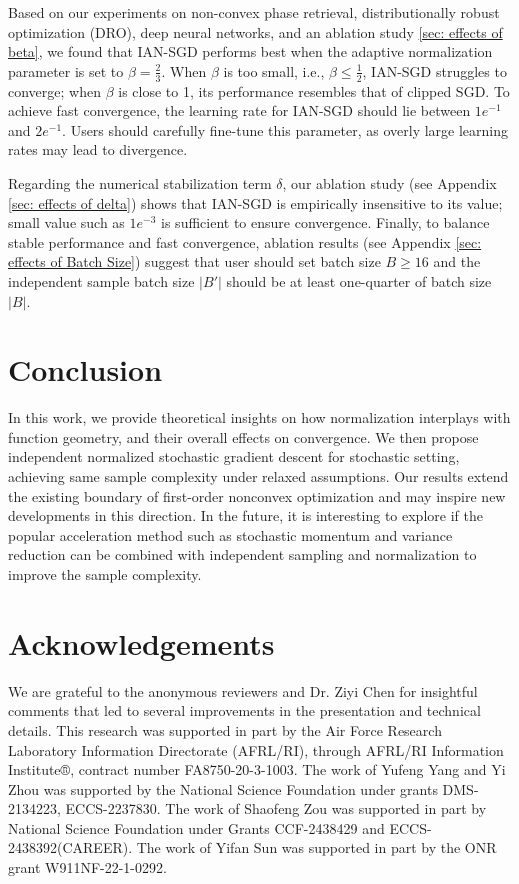 \documentclass[10pt]{article} %
\begin{document}
Based on our experiments on non-convex phase retrieval, distributionally robust optimization (DRO), deep neural networks, and an ablation study \ref{sec: effects of beta}, we found that IAN-SGD performs best when the adaptive normalization parameter is set to $\beta = \frac{2}{3}$. When $\beta$ is too small, i.e., $\beta\leq\frac{1}{2}$, IAN-SGD struggles to converge; when $\beta$ is close to 1, its performance resembles that of clipped SGD. To achieve fast convergence, the learning rate for IAN-SGD should lie between $1e^{-1}$ and $2e^{-1}$. Users should carefully fine-tune this parameter, as overly large learning rates may lead to divergence.

Regarding the numerical stabilization term $\delta$, our ablation study (see Appendix \ref{sec: effects of delta}) shows that IAN-SGD is empirically insensitive to its value; small value such as $1e^{-3}$ is sufficient to ensure convergence. Finally, to balance stable performance and fast convergence, ablation results (see Appendix \ref{sec: effects of Batch Size}) suggest that user should set batch size $B\geq 16$ and the independent sample batch size $|B'|$ should be at least one-quarter of batch size $|B|$.


\section{Conclusion}
In this work, we provide theoretical insights on how normalization interplays with function geometry, and their overall effects on convergence. We then propose independent normalized stochastic gradient descent for stochastic setting, achieving same sample complexity under relaxed assumptions. Our results extend the existing boundary of first-order nonconvex optimization and may inspire new
developments in this direction. In the future, it is interesting to explore if the popular acceleration method such as stochastic momentum and variance reduction can be combined with independent sampling and normalization to improve the sample complexity.

\section{Acknowledgements}
We are grateful to the anonymous reviewers and Dr. Ziyi Chen for insightful comments that led to several improvements in the presentation and technical details.
This research was supported in part by the Air Force Research Laboratory Information Directorate (AFRL/RI), through AFRL/RI Information Institute®, contract number FA8750-20-3-1003. The work of Yufeng Yang and Yi Zhou was supported by the National Science Foundation under grants DMS-2134223, ECCS-2237830. The work of Shaofeng Zou was supported in part by National Science Foundation under Grants CCF-2438429 and ECCS-2438392(CAREER).
The work of Yifan Sun was supported in part by the ONR grant W911NF-22-1-0292. 
\end{document}
